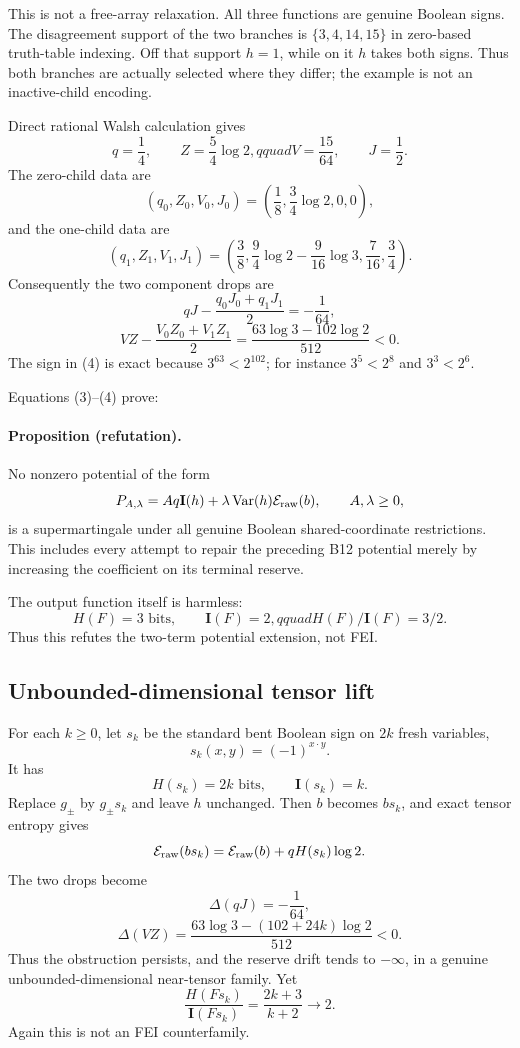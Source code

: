 This is not a free-array relaxation.  All three functions are genuine Boolean
signs.  The disagreement support of the two branches is
\(\{3,4,14,15\}\) in zero-based truth-table indexing.  Off that support
\(h=1\), while on it \(h\) takes both signs.  Thus both branches are actually
selected where they differ; the example is not an inactive-child encoding.

Direct rational Walsh calculation gives
\[
 q=\frac14,\qquad Z=\frac54\log2,qquad
 V=\frac{15}{64},\qquad J=\frac12.
\]
The zero-child data are
\[
 (q_0,Z_0,V_0,J_0)=
 \left(\frac18,\frac34\log2,0,0\right),
\]
and the one-child data are
\[
 (q_1,Z_1,V_1,J_1)=
 \left(\frac38,\frac94\log2-\frac9{16}\log3,
       \frac7{16},\frac34\right).
\]
Consequently the two component drops are
\[
 qJ-\frac{q_0J_0+q_1J_1}{2}=-\frac1{64},                         \tag{3}
\]
\[
 VZ-\frac{V_0Z_0+V_1Z_1}{2}
 =\frac{63\log3-102\log2}{512}<0.                                \tag{4}
\]
The sign in (4) is exact because
\(3^{63}<2^{102}\); for instance \(3^5<2^8\) and
\(3^3<2^6\).

Equations (3)--(4) prove:

\paragraph{Proposition (refutation).}
No nonzero potential of the form
\[
 P_{A,\lambda}=Aq\mathbf I(h)+\lambda\operatorname{Var}(h)
                 \mathcal E_{\rm raw}(b),\qquad A,\lambda\ge0,
\]
is a supermartingale under all genuine Boolean shared-coordinate
restrictions.  This includes every attempt to repair the preceding B12
potential merely by increasing the coefficient on its terminal reserve.

The output function itself is harmless:
\[
 H(F)=3\text{ bits},\qquad \mathbf I(F)=2,qquad H(F)/\mathbf I(F)=3/2.
\]
Thus this refutes the two-term potential extension, not FEI.

\subsection*{Unbounded-dimensional tensor lift}

For each \(k\ge0\), let \(s_k\) be the standard bent Boolean sign on
\(2k\) fresh variables,
\[
 s_k(x,y)=(-1)^{x\cdot y}.
\]
It has
\[
 H(s_k)=2k\text{ bits},\qquad \mathbf I(s_k)=k.
\]
Replace \(g_\pm\) by \(g_\pm s_k\) and leave \(h\) unchanged.  Then
\(b\) becomes \(bs_k\), and exact tensor entropy gives
\[
 \mathcal E_{\rm raw}(bs_k)=\mathcal E_{\rm raw}(b)+qH(s_k)\log2.
\]
The two drops become
\[
 \Delta(qJ)=-\frac1{64},
\]
\[
 \Delta(VZ)=
 \frac{63\log3-(102+24k)\log2}{512}<0.                            \tag{5}
\]
Thus the obstruction persists, and the reserve drift tends to
\(-\infty\), in a genuine unbounded-dimensional near-tensor family.  Yet
\[
 \frac{H(Fs_k)}{\mathbf I(Fs_k)}
 =\frac{2k+3}{k+2}\longrightarrow2.
\]
Again this is not an FEI counterfamily.

